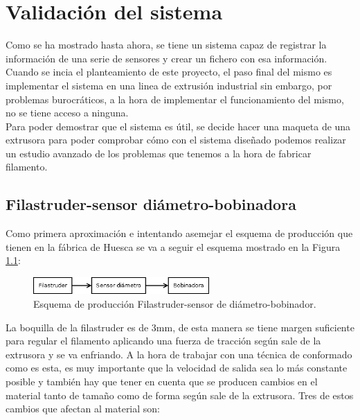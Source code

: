 \chapter{Validación del sistema}
\label{cap:resultados}

Como se ha mostrado hasta ahora, se tiene un sistema capaz de registrar la información de una serie de sensores y crear un fichero con esa información. Cuando se incia el planteamiento de este proyecto, el paso final del mismo es implementar el sistema en una linea de extrusión industrial sin embargo, por problemas burocráticos, a la hora de implementar el funcionamiento del mismo, no se tiene acceso a ninguna. \\

Para poder demostrar que el sistema es útil, se decide hacer una maqueta de una extrusora para poder comprobar cómo con el sistema diseñado podemos realizar un estudio avanzado de los problemas que tenemos a la hora de fabricar filamento.\\


\section{Filastruder-sensor diámetro-bobinadora}
\label{sec:FSB}

Como primera aproximación e intentando asemejar el esquema de producción que tienen en la fábrica de Huesca se va a seguir el esquema mostrado en la Figura \ref{fig:esquemap_FSB}:

\begin{figure}[H]
    \centering
    \includegraphics[width=0.6\textwidth]{images/producciones/Diagram1.png}
    \caption[Esquema de producción Filastruder-sensor de diámetro-bobinadora.]{Esquema de producción Filastruder-sensor de diámetro-bobinador.}
    \label{fig:esquemap_FSB}
\end{figure}

La boquilla de la filastruder es de 3mm, de esta manera se tiene margen suficiente para regular el filamento aplicando una fuerza de tracción según sale de la extrusora y se va enfriando. A la hora de trabajar con una técnica de conformado como es esta, es muy importante que la velocidad de salida sea lo más constante posible y también hay que tener en cuenta que se producen cambios en el material tanto de tamaño como de forma según sale de la extrusora. Tres de estos cambios que afectan al material son: \cite{tecno_polimeros}


